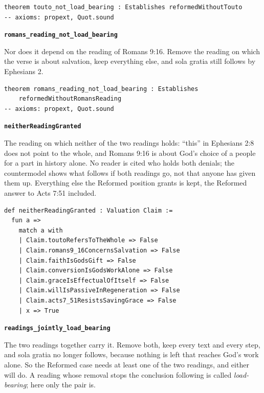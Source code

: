 \documentclass[11pt]{article}
\begin{document}
{\small\begin{verbatim}
theorem touto_not_load_bearing : Establishes reformedWithoutTouto
-- axioms: propext, Quot.sound
\end{verbatim}}
\par\medskip\noindent\textbf{\texttt{romans\_\allowbreak{}reading\_\allowbreak{}not\_\allowbreak{}load\_\allowbreak{}bearing}}\par\nobreak\noindent
Nor does it depend on the reading of Romans 9:16. Remove the reading on which the verse is about salvation, keep everything else, and sola gratia still follows by Ephesians 2.

{\small\begin{verbatim}
theorem romans_reading_not_load_bearing : Establishes
    reformedWithoutRomansReading
-- axioms: propext, Quot.sound
\end{verbatim}}
\par\medskip\noindent\textbf{\texttt{neither\allowbreak{}Reading\allowbreak{}Granted}}\par\nobreak\noindent
The reading on which neither of the two readings holds: “this” in Ephesians 2:8 does not point to the whole, and Romans 9:16 is about God’s choice of a people for a part in history alone. No reader is cited who holds both denials; the countermodel shows what follows if both readings go, not that anyone has given them up. Everything else the Reformed position grants is kept, the Reformed answer to Acts 7:51 included.

{\small\begin{verbatim}
def neitherReadingGranted : Valuation Claim :=
  fun a =>
    match a with
    | Claim.toutoRefersToTheWhole => False
    | Claim.romans9_16ConcernsSalvation => False
    | Claim.faithIsGodsGift => False
    | Claim.conversionIsGodsWorkAlone => False
    | Claim.graceIsEffectualOfItself => False
    | Claim.willIsPassiveInRegeneration => False
    | Claim.acts7_51ResistsSavingGrace => False
    | x => True
\end{verbatim}}
\par\medskip\noindent\textbf{\texttt{readings\_\allowbreak{}jointly\_\allowbreak{}load\_\allowbreak{}bearing}}\par\nobreak\noindent
The two readings together carry it. Remove both, keep every text and every step, and sola gratia no longer follows, because nothing is left that reaches God’s work alone. So the Reformed case needs at least one of the two readings, and either will do. A reading whose removal stops the conclusion following is called \emph{load-bearing}; here only the pair is.
\end{document}
